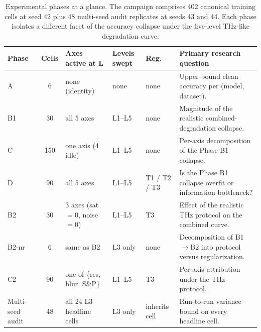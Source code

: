 \begin{table}[htbp]
  \centering
  \caption{Experimental phases at a glance. The campaign comprises 402
    canonical training cells at seed 42 plus 48 multi-seed audit replicates
    at seeds 43 and 44. Each phase isolates a different facet of the
    accuracy collapse under the five-level THz-like degradation curve.}
  \label{tab:phases_overview}
  \small
  \setlength{\tabcolsep}{4pt}
  \renewcommand{\arraystretch}{1.15}
  \begin{tabular}{l c p{2.6cm} p{1.6cm} p{1.4cm} p{5.3cm}}
    \toprule
    \textbf{Phase} & \textbf{Cells} & \textbf{Axes active at L} & \textbf{Levels swept} & \textbf{Reg.} & \textbf{Primary research question} \\
    \midrule
    A      & 6   & none (identity) & none & none & Upper-bound clean accuracy per (model, dataset). \\
    B1     & 30  & all 5 axes      & L1--L5 & none & Magnitude of the realistic combined-degradation collapse. \\
    C      & 150 & one axis (4 idle) & L1--L5 & none & Per-axis decomposition of the Phase B1 collapse. \\
    D      & 90  & all 5 axes      & L1--L5 & T1 / T2 / T3 & Is the Phase B1 collapse overfit or information bottleneck? \\
    B2     & 30  & 3 axes (sat $=0$, noise $=0$) & L1--L5 & T3 & Effect of the realistic THz protocol on the combined curve. \\
    B2-nr  & 6   & same as B2        & L3 only & none & Decomposition of B1$\to$B2 into protocol versus regularization. \\
    C2     & 90  & one of \{res, blur, S\&P\} & L1--L5 & T3 & Per-axis attribution under the THz protocol. \\
    \midrule
    Multi-seed audit & 48 & all 24 L3 headline cells & L3 only & inherits cell & Run-to-run variance bound on every headline cell. \\
    \bottomrule
  \end{tabular}
\end{table}

